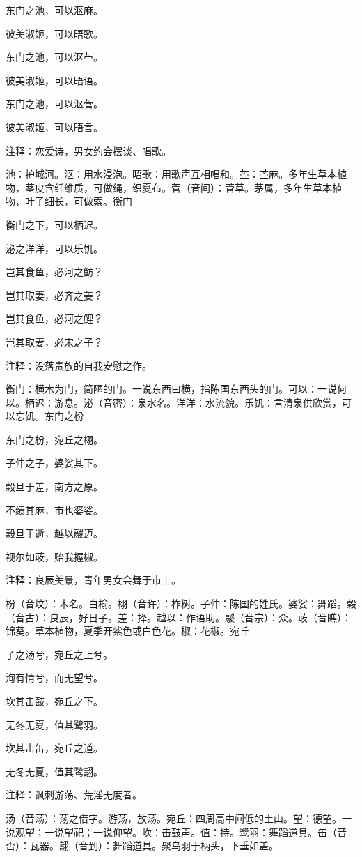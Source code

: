 \documentclass[12pt,UTF8]{ctexbook}
\begin{document}
东门之池，可以沤麻。

彼美淑姬，可以晤歌。

东门之池，可以沤苎。

彼美淑姬，可以晤语。

东门之池，可以沤菅。

彼美淑姬，可以晤言。

注释：恋爱诗，男女约会摆谈、唱歌。

池：护城河。沤：用水浸泡。晤歌：用歌声互相唱和。苎：苎麻。多年生草本植物，茎皮含纤维质，可做绳，织夏布。菅（音间）：菅草。茅属，多年生草本植物，叶子细长，可做索。衡门

衡门之下，可以栖迟。

泌之洋洋，可以乐饥。

岂其食鱼，必河之鲂？

岂其取妻，必齐之姜？

岂其食鱼，必河之鲤？

岂其取妻，必宋之子？

注释：没落贵族的自我安慰之作。

衡门：横木为门，简陋的门。一说东西曰横，指陈国东西头的门。可以：一说何以。栖迟：游息。泌（音密）：泉水名。洋洋：水流貌。乐饥：言清泉供欣赏，可以忘饥。东门之枌

东门之枌，宛丘之栩。

子仲之子，婆娑其下。

榖旦于差，南方之原。

不绩其麻，市也婆娑。

榖旦于逝，越以鬷迈。

视尔如荍，贻我握椒。

注释：良辰美景，青年男女会舞于市上。

枌（音坟）：木名。白榆。栩（音许）：柞树。子仲：陈国的姓氏。婆娑：舞蹈。榖（音古）：良辰，好日子。差：择。越以：作语助。鬷（音宗）：众。荍（音瞧）：锦葵。草本植物，夏季开紫色或白色花。椒：花椒。宛丘

子之汤兮，宛丘之上兮。

洵有情兮，而无望兮。

坎其击鼓，宛丘之下。

无冬无夏，值其鹭羽。

坎其击缶，宛丘之道。

无冬无夏，值其鹭翿。

注释：讽刺游荡、荒淫无度者。

汤（音荡）：荡之借字。游荡，放荡。宛丘：四周高中间低的土山。望：德望。一说观望；一说望祀；一说仰望。坎：击鼓声。值：持。鹭羽：舞蹈道具。缶（音否）：瓦器。翿（音到）：舞蹈道具。聚鸟羽于柄头，下垂如盖。
\end{document}
